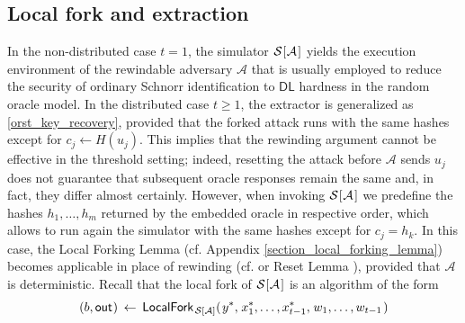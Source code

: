 \documentclass{iacrtrans}
\begin{document}
\subsection{Local fork and extraction}\label{section_extractability}

In the non-distributed case $t=1$,
the simulator
$\mathcal{S}\hspace{0.5pt}[\hspace{0.5pt}\mathcal{A}\hspace{1pt}]$
yields the execution environment of the rewindable adversary
$\mathcal{A}$ that is usually employed to
reduce the security of ordinary Schnorr identification
to $\mathsf{DL}$ hardness in the random oracle model.
In the distributed case $t \ge 1$, the extractor is generalized as
\eqref{orst_key_recovery},
provided that the forked attack runs with the same hashes
except for $c_j \leftarrow H(u_j)$.
This implies that the rewinding argument
cannot be effective in the threshold setting;
indeed, resetting the attack before
$\mathcal{A}$ sends $u_j$ does not
guarantee that subsequent oracle responses remain the same
and, in fact, they differ almost certainly.
However, when invoking
$\mathcal{S}\hspace{0.5pt}[\hspace{0.5pt}\mathcal{A}\hspace{1pt}]$
we predefine the hashes $h_1, \dots, h_m$
returned by the embedded oracle in respective order,
which allows to run again the simulator with the same hashes
except for $c_j = h_k$.
In this case, the Local Forking Lemma
(cf. Appendix \ref{section_local_forking_lemma})
becomes applicable in place of rewinding
(cf. \cite{paper_bellare_musig} or Reset Lemma \cite{paper_bellare_palacio}),
provided that $\mathcal{A}$
is deterministic.
Recall that the local fork of
$\mathcal{S}\hspace{0.5pt}[\hspace{0.5pt}\mathcal{A}\hspace{1pt}]$
is an algorithm of the form
\vspace{5pt}
\begin{equation*}
(
	\vspace{1pt}
	b,
	\vspace{1pt}
	\mathsf{out}
	\hspace{0.5pt}
)
\hspace{2pt}
\leftarrow
\hspace{2pt}
\mathsf{LocalFork}_{
		\hspace{1pt}
    	\mathcal{S}\hspace{0pt}[
    		\hspace{0pt}
    		\mathcal{A}
    		\hspace{0pt}
    	]
    }
	(
   		\hspace{1pt}
		y ^*,
		\hspace{1pt}
		x_1^*, \dots, x_{t-1}^*,
		\hspace{1pt}
		w_1, \dots, w_{t-1}
		\hspace{1pt}
   	)
\vspace{5pt}
\end{equation*}
\end{document}
